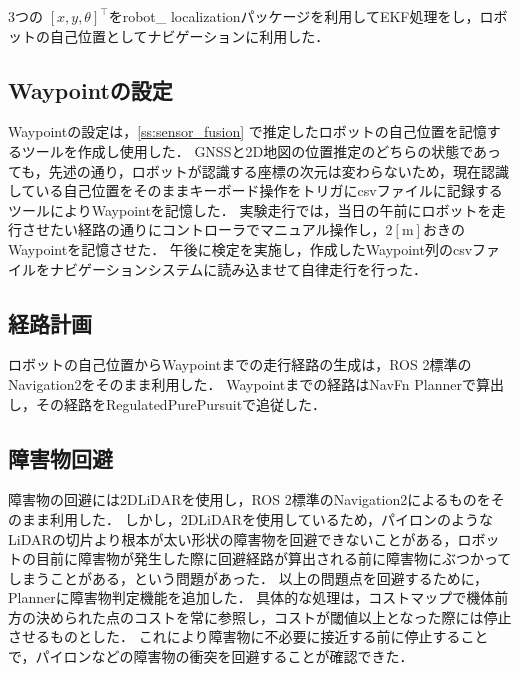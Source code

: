 \documentclass[platex,dvipdfmx]{rbproceedings}
\begin{document}
3つの $\left[ x, y, \theta \right] ^\top$をrobot\_ localization\cite{localization}パッケージを利用してEKF処理をし，ロボットの自己位置としてナビゲーションに利用した．

\subsection{Waypointの設定}
Waypointの設定は，\ref{ss:sensor_fusion} で推定したロボットの自己位置を記憶するツールを作成し使用した．
GNSSと2D地図の位置推定のどちらの状態であっても，先述の通り，ロボットが認識する座標の次元は変わらないため，現在認識している自己位置をそのままキーボード操作をトリガにcsvファイルに記録するツールによりWaypointを記憶した．
実験走行では，当日の午前にロボットを走行させたい経路の通りにコントローラでマニュアル操作し，$2[ \mathrm{m}]$おきのWaypointを記憶させた．
午後に検定を実施し，作成したWaypoint列のcsvファイルをナビゲーションシステムに読み込ませて自律走行を行った．

\subsection{経路計画}
ロボットの自己位置からWaypointまでの走行経路の生成は，ROS 2標準のNavigation2\cite{nav2}をそのまま利用した．
Waypointまでの経路はNavFn Planner\cite{navfn}で算出し，その経路をRegulatedPurePursuit\cite{rrp}で追従した．

\subsection{障害物回避} \label{ss:avoidance}
障害物の回避には2DLiDARを使用し，ROS 2標準のNavigation2によるものをそのまま利用した．
しかし，2DLiDARを使用しているため，パイロンのようなLiDARの切片より根本が太い形状の障害物を回避できないことがある，ロボットの目前に障害物が発生した際に回避経路が算出される前に障害物にぶつかってしまうことがある，という問題があった．
以上の問題点を回避するために，Plannerに障害物判定機能を追加した．
具体的な処理は，コストマップで機体前方の決められた点のコストを常に参照し，コストが閾値以上となった際には停止させるものとした．
これにより障害物に不必要に接近する前に停止することで，パイロンなどの障害物の衝突を回避することが確認できた．
\end{document}
